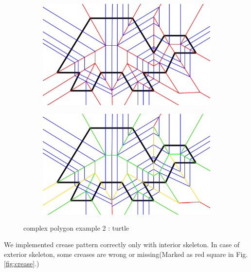 \documentclass[11pt]{article}
\begin{document}
\begin{figure}[H]
\begin{subfigure}[b]{0.18\textwidth}
     \label{fig:c22}
  \end{subfigure}
      \begin{subfigure}[b]{0.18\textwidth}
    \includegraphics[width=\textwidth]{FIGS/Part4/c23}
     \label{fig:c23}
  \end{subfigure}
      \begin{subfigure}[b]{0.18\textwidth}
    \includegraphics[width=\textwidth]{FIGS/Part4/c24}
     \label{fig:c24}
  \end{subfigure}
    \caption{complex polygon example 2 : turtle}
    \label{fig:complex_example2}
\end{figure}
We implemented crease pattern correctly only with interior skeleton. In case of exterior skeleton, some creases are wrong or missing(Marked as red square in Fig. \ref{fig:crease}.)
\end{document}
